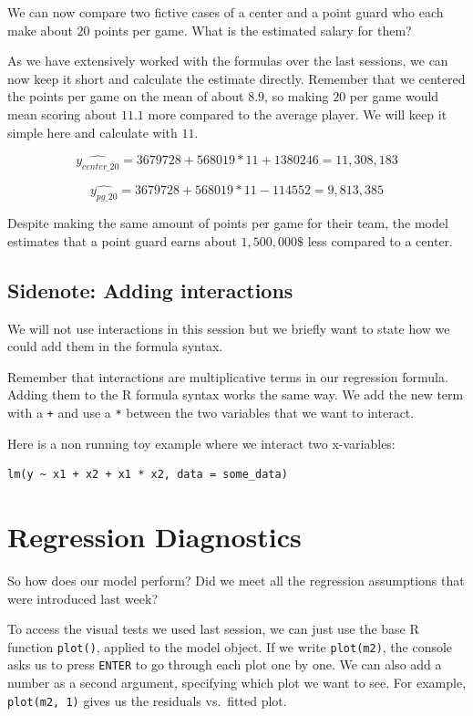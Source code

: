 \documentclass[
]{book}
\begin{document}
We can now compare two fictive cases of a center and a point guard who
each make about \(20\) points per game. What is the estimated salary for
them?

As we have extensively worked with the formulas over the last sessions,
we can now keep it short and calculate the estimate directly. Remember
that we centered the points per game on the mean of about \(8.9\), so
making \(20\) per game would mean scoring about \(11.1\) more compared to
the average player. We will keep it simple here and calculate with \(11\).

\[\hat{y_{center\_20}} = 3679728 + 568019 * 11 + 1380246 = 11,308,183\]

\[\hat{y_{pg\_20}} = 3679728 + 568019 * 11 - 114552 = 9,813,385\]

Despite making the same amount of points per game for their team, the
model estimates that a point guard earns about \(1,500,000\$\) less
compared to a center.

\hypertarget{sidenote-adding-interactions}{%
\subsection{Sidenote: Adding interactions}\label{sidenote-adding-interactions}}

We will not use interactions in this session but we briefly want to
state how we could add them in the formula syntax.

Remember that interactions are multiplicative terms in our regression
formula. Adding them to the R formula syntax works the same way. We add
the new term with a \texttt{+} and use a \texttt{*} between the two variables that we
want to interact.

Here is a non running toy example where we interact two x-variables:

\begin{verbatim}
lm(y ~ x1 + x2 + x1 * x2, data = some_data)
\end{verbatim}

\hypertarget{regression-diagnostics-1}{%
\section{Regression Diagnostics}\label{regression-diagnostics-1}}

So how does our model perform? Did we meet all the regression
assumptions that were introduced last week?

To access the visual tests we used last session, we can just use the
base R function \texttt{plot()}, applied to the model object. If we write
\texttt{plot(m2)}, the console asks us to press \texttt{ENTER} to go through each plot
one by one. We can also add a number as a second argument, specifying
which plot we want to see. For example, \texttt{plot(m2,\ 1)} gives us the
residuals vs.~fitted plot.
\end{document}
